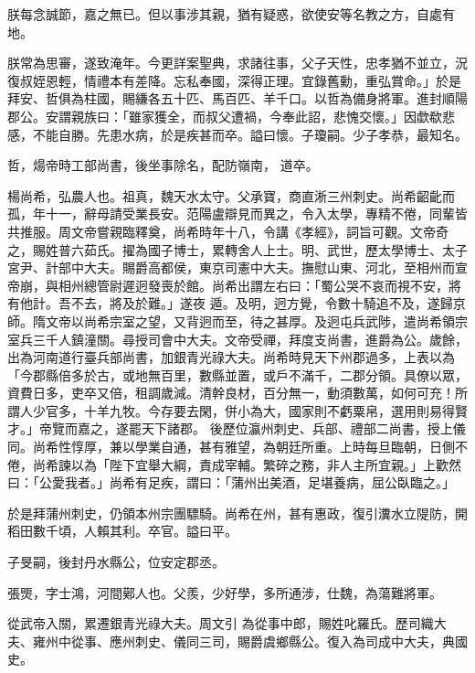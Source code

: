 \begin{pinyinscope}
 朕每念誠節，嘉之無已。但以事涉其親，猶有疑惑，欲使安等名教之方，自處有地。



 朕常為思審，遂致淹年。今更詳案聖典，求諸往事，父子天性，忠孝猶不並立，況復叔姪恩輕，情禮本有差降。忘私奉國，深得正理。宜錄舊勳，重弘賞命。」於是拜安、哲俱為柱國，賜縑各五十匹、馬百匹、羊千口。以哲為備身將軍。進封順陽郡公。安謂親族曰：「雖家獲全，而叔父遭禍，今奉此詔，悲愧交懷。」因歔欷悲感，不能自勝。先患水病，於是疾甚而卒。謚曰懷。子瓊嗣。少子孝恭，最知名。



 哲，煬帝時工部尚書，後坐事除名，配防嶺南，
 道卒。



 楊尚希，弘農人也。祖真，魏天水太守。父承寶，商直淅三州刺史。尚希齠齔而孤，年十一，辭母請受業長安。范陽盧辯見而異之，令入太學，專精不倦，同輩皆共推服。周文帝嘗親臨釋奠，尚希時年十八，令講《孝經》，詞旨可觀。文帝奇之，賜姓普六茹氏。擢為國子博士，累轉舍人上士。明、武世，歷太學博士、太子宮尹、計部中大夫。賜爵高都侯，東京司憲中大夫。撫慰山東、河北，至相州而宣帝崩，與相州總管尉遲迥發喪於館。尚希出謂左右曰：「蜀公哭不哀而視不安，將有他計。吾不去，將及於難。」遂夜
 遁。及明，迥方覺，令數十騎追不及，遂歸京師。隋文帝以尚希宗室之望，又背迥而至，待之甚厚。及迥屯兵武陟，遣尚希領宗室兵三千人鎮潼關。尋授司會中大夫。文帝受禪，拜度支尚書，進爵為公。歲餘，出為河南道行臺兵部尚書，加銀青光祿大夫。尚希時見天下州郡過多，上表以為「今郡縣倍多於古，或地無百里，數縣並置，或戶不滿千，二郡分領。具僚以眾，資費日多，吏卒又倍，租調歲減。清幹良材，百分無一，動須數萬，如何可充！所謂人少官多，十羊九牧。今存要去閑，併小為大，國家則不虧粟帛，選用則易得賢才。」帝覽而嘉之，遂罷天下諸郡。
 後歷位瀛州刺史、兵部、禮部二尚書，授上儀同。尚希性惇厚，兼以學業自通，甚有雅望，為朝廷所重。上時每旦臨朝，日側不倦，尚希諫以為「陛下宜舉大綱，責成宰輔。繁碎之務，非人主所宜親。」上歡然曰：「公愛我者。」尚希有足疾，謂曰：「蒲州出美酒，足堪養病，屈公臥臨之。」



 於是拜蒲州刺史，仍領本州宗團驃騎。尚希在州，甚有惠政，復引瀵水立隄防，開稻田數千頃，人賴其利。卒官。謚曰平。



 子旻嗣，後封丹水縣公，位安定郡丞。



 張煚，字士鴻，河間鄚人也。父羨，少好學，多所通涉，仕魏，為蕩難將軍。



 從武帝入關，累遷銀青光祿大夫。周文引
 為從事中郎，賜姓叱羅氏。歷司織大夫、雍州中從事、應州刺史、儀同三司，賜爵虞鄉縣公。復入為司成中大夫，典國史。




\end{pinyinscope}
